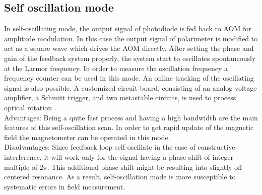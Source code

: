 \subsection{Self oscillation mode}
In self-oscillating mode, the output signal of photodiode is  fed back to AOM for  amplitude modulation. In this case the  output signal of polarimeter is modified to act as a square wave which drives the AOM directly. After setting the phase and gain of the feedback system properly, the system start to oscillates spontaneously  at the Larmor frequency. In order to measure the oscillation frequency a frequency counter can be used in this mode. An online tracking of the oscillating signal is also possible.
 A customized circuit board, consisting of an analog voltage amplifier, a Schmitt trigger, and two metastable circuits, is used to process optical rotation \cite{PhysRevA.62.043403}.\\
Advantages: Being a quite fast process and having a high bandwidth are the main features of this self-oscillation scan. In order to get rapid update of the magnetic field the magnetometer can be operated in this mode.\\
 Disadvantages: Since feedback loop self-oscillate in the case of constructive interference, it will work only for the signal having a phase shift of integer multiple of $ 2\pi$. This additional phase shift might be resulting into slightly off-centered resonance. As a result, self-oscillation mode is more susceptible to systematic errors in field measurement.


